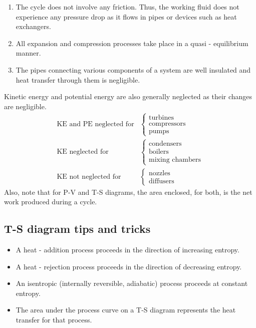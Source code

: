 \documentclass[class=report, crop=false, 12pt,a4paper]{standalone}
\begin{document}
\begin{enumerate}[noitemsep]
  \item The cycle does not involve any friction. Thus, the working fluid does not experience any pressure drop as it flows in pipes or devices such as heat exchangers.
  \item All expansion and compression processes take place in a quasi - equilibrium manner.
  \item The pipes connecting various components of a system are well insulated and heat transfer through them is negligible.
\end{enumerate}
Kinetic energy and potential energy are also generally neglected as their changes are negligible.
\begin{align}
  \textrm{KE and PE neglected for} & \begin{cases}
    \textrm{turbines}\\
    \textrm{compressors}\\
    \textrm{pumps}
  \end{cases}\\
  \textrm{KE neglected for} & \begin{cases}
    \textrm{condensers}\\
    \textrm{boilers}\\
    \textrm{mixing chambers}
  \end{cases}\\
  \textrm{KE not neglected for} & \begin{cases}
    \textrm{nozzles}\\
    \textrm{diffusers}
  \end{cases}
\end{align}
Also, note that for P-V and T-S diagrams, the area enclosed, for both, is the net work produced during a cycle.
\subsection{T-S diagram tips and tricks}
\begin{itemize}[noitemsep]
  \item A heat - addition process proceeds in the direction of increasing entropy. 
  \item A heat - rejection process proceeds in the direction of decreasing entropy. 
  \item An isentropic (internally reversible, adiabatic) process proceeds at constant entropy. 
  \item The area under the process curve on a T-S diagram represents the heat transfer for that process.
\end{itemize}
\end{document}

